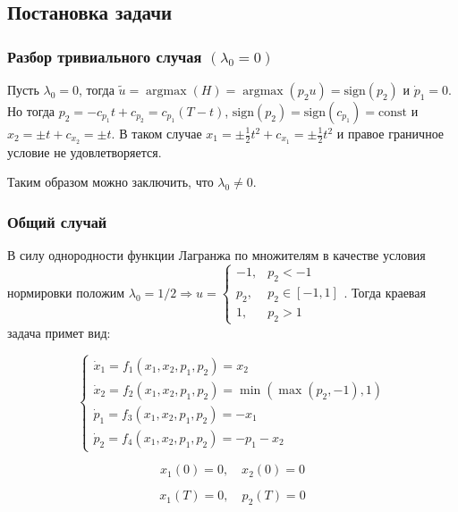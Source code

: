 \documentclass[a4paper,12pt]{article}
\DeclareMathOperator*{\argmax}{argmax}
\begin{document}
\subsection{Постановка задачи}

\subsubsection{\texorpdfstring{Разбор тривиального случая
    \((\lambda_0=0)\)}{Разбор тривиального случая (\textbackslash lambda\_0=0)}}

Пусть \(\lambda_0=0\), тогда
\(\tilde{u}=\argmax(H)=\argmax\left(p_2u\right) = \text{sign}(p_2)\) и
\(\dot{p}_1=0\).
Но тогда \(p_2=-c_{p_1} t+c_{p_2}=c_{p_1} (T - t)\),
\(\text{sign}(p_2)=\text{sign}(c_{p_1})=\text{const}\) и
\(x_2=\pm t + c_{x_2}=\pm t\). В таком случае
\(x_1=\pm \frac{1}{2} t^2+c_{x_1}=\pm \frac{1}{2} t^2\) и правое
граничное условие не удовлетворяется.

Таким образом можно заключить, что \(\lambda_0 \neq 0\).

\subsubsection{Общий случай}

В силу однородности функции Лагранжа по множителям в качестве условия
нормировки положим
\(\lambda_0=1/2 \Rightarrow u=
\begin{cases}
  -1 , & p_2 < -1        \\
  p_2, & p_2 \in [-1, 1] \\
  1  , & p_2 > 1
\end{cases}\). Тогда краевая
задача примет вид:

\begin{equation}
  \label{system}
  \begin{cases}
    \dot{x}_1=f_1(x_1,x_2,p_1,p_2)=x_2                  \\
    \dot{x}_2=f_2(x_1,x_2,p_1,p_2)=\min(\max(p_2,-1),1) \\
    \dot{p}_1=f_3(x_1,x_2,p_1,p_2)=-x_1                 \\
    \dot{p}_2=f_4(x_1,x_2,p_1,p_2)=-p_1-x_2
  \end{cases}
\end{equation}

\begin{equation}
  \label{left_cond}
  x_1(0)=0, \quad x_2(0)=0
\end{equation}

\begin{equation}
  \label{right_cond}
  x_1(T)=0, \quad p_2(T)=0
\end{equation}
\end{document}
